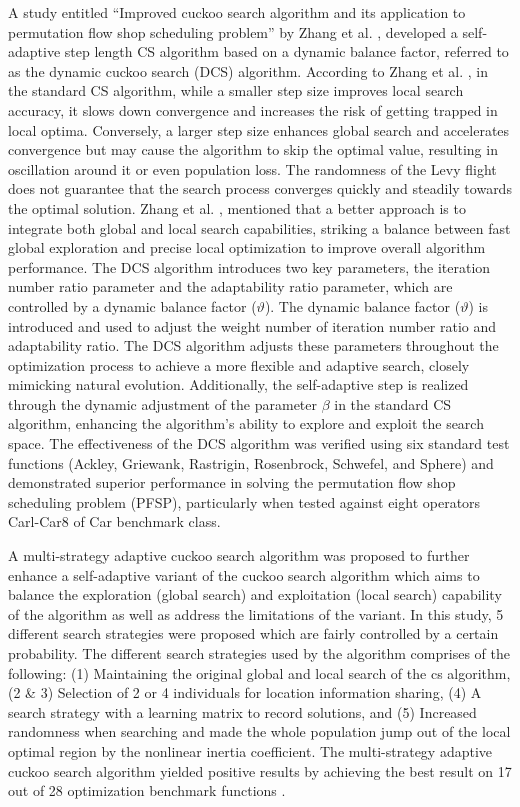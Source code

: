 \documentclass{article}
\begin{document}
A study entitled “Improved cuckoo search algorithm and its application to permutation flow shop scheduling problem” by Zhang et al. \cite{zhang2020improved}, developed a self-adaptive step length CS algorithm based on a dynamic balance factor, referred to as the dynamic cuckoo search (DCS) algorithm. According to Zhang et al. \cite{zhang2020improved}, in the standard CS algorithm, while a smaller step size improves local search accuracy, it slows down convergence and increases the risk of getting trapped in local optima. Conversely, a larger step size enhances global search and accelerates convergence but may cause the algorithm to skip the optimal value, resulting in oscillation around it or even population loss. The randomness of the Levy flight does not guarantee that the search process converges quickly and steadily towards the optimal solution. Zhang et al. \cite{zhang2020improved}, mentioned that a better approach is to integrate both global and local search capabilities, striking a balance between fast global exploration and precise local optimization to improve overall algorithm performance. The DCS algorithm introduces two key parameters, the iteration number ratio parameter and the adaptability ratio parameter, which are controlled by a dynamic balance factor ($\vartheta$). The dynamic balance factor ($\vartheta$) is introduced and used to adjust the weight number of iteration number ratio and adaptability ratio. The DCS algorithm adjusts these parameters throughout the optimization process to achieve a more flexible and adaptive search, closely mimicking natural evolution. Additionally, the self-adaptive step is realized through the dynamic adjustment of the parameter $\beta$ in the standard CS algorithm, enhancing the algorithm’s ability to explore and exploit the search space. The effectiveness of the DCS algorithm was verified using six standard test functions (Ackley, Griewank, Rastrigin, Rosenbrock, Schwefel, and Sphere) and demonstrated superior performance in solving the permutation flow shop scheduling problem (PFSP), particularly when tested against eight operators Carl-Car8 of Car benchmark class.

A multi-strategy adaptive cuckoo search algorithm was proposed to further enhance a self-adaptive variant of the cuckoo search algorithm which aims to balance the exploration (global search) and exploitation (local search) capability of the algorithm as well as address the limitations of the variant. In this study, 5 different search strategies were proposed which are fairly controlled by a certain probability. The different search strategies used by the algorithm comprises of the following: (1) Maintaining the original global and local search of the cs algorithm, (2 \& 3) Selection of 2 or 4 individuals for location information sharing, (4) A search strategy with a learning matrix to record solutions, and (5) Increased randomness when searching and made the whole population jump out of the local optimal region by the nonlinear inertia coefficient. The multi-strategy adaptive cuckoo search algorithm yielded positive results by achieving the best result on 17 out of 28 optimization benchmark functions \cite{gao2021adaptive}.
\end{document}
